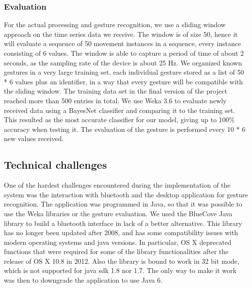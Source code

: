 \subsubsection{Evaluation}
For the actual processing and gesture recognition, we use a sliding window approach on the time series data we receive.
The window is of size 50, hence it will evaluate a sequence of 50 movement instances in a sequence,
every instance consisting of 6 values.
The window is able to capture a period of time of about 2 seconds, as the sampling rate of the device is about 25 Hz.
We organized known gestures in a very large training set, each individual gesture stored as a list of 50 * 6 values plus an identifier, in a way that every gesture will be compatible with the sliding window. 
The training data set in the final version of the project reached more than 500 entries in total.
We use Weka 3.6 to evaluate newly received data using a BayesNet classifier and comparing it to the training set. 
This resulted as the most accurate classifier for our model, giving up to 100\% accuracy when testing it.
The evaluation of the gesture is performed every 10 * 6 new values received.

\subsection{Technical challenges}
One of the hardest challenges encountered during the implementation of the system was the interaction with bluetooth and the desktop application for gesture recognition.
The application was programmed in Java, so that it was possible to use the Weka libraries or the gesture evaluation.
We used the BlueCove Java library to build a bluetooth interface \cite{bluecove}  in lack of a better alternative.
This library has no longer been updated after 2008, and has some compatibility issues with modern operating systems and java versions.
In particular, OS X deprecated functions that were required for some of the library functionalities after the release of OS X 10.8 in 2012.
Also the library is bound to work in 32 bit mode, which is not supported for java sdk 1.8 nor 1.7.
The only way to make it work was then to downgrade the application to use Java 6.








